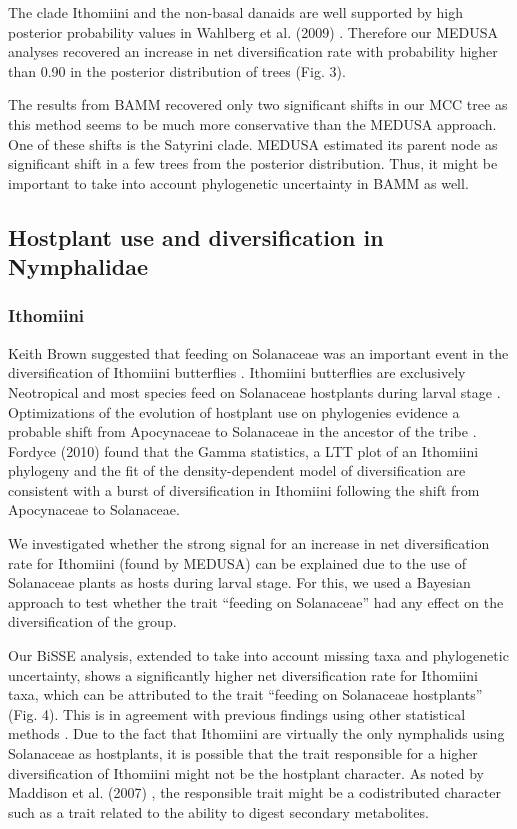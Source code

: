 \documentclass[10pt]{article}
\begin{document}
The clade Ithomiini and the non-basal danaids are well supported by high
posterior probability values in Wahlberg et al. (2009) \cite{wahlberg2009}.
Therefore our MEDUSA analyses recovered an increase in net
diversification rate with probability higher than 0.90 in the posterior
distribution of trees (Fig. 3).

The results from BAMM recovered only two significant shifts in our MCC tree
as this method seems to be much more conservative than the MEDUSA approach.
One of these 
shifts is the Satyrini clade. MEDUSA estimated its parent node as
significant shift in a few trees from the posterior distribution. 
Thus, it might be important to
take into account phylogenetic uncertainty in BAMM as well.

\subsection*{Hostplant use and diversification in
Nymphalidae}

\subsubsection*{Ithomiini}

Keith Brown suggested that feeding on Solanaceae was an important event
in the diversification of Ithomiini butterflies \cite{brown1987}. Ithomiini
butterflies are exclusively Neotropical and most species feed on
Solanaceae hostplants during larval stage \cite{willmott2006}.
Optimizations of the
evolution of hostplant use on phylogenies evidence a probable shift from
Apocynaceae to Solanaceae in the ancestor of the tribe 
\cite{willmott2006,brower2006}.
Fordyce (2010) \cite{fordyce2010} found that the Gamma statistics, a LTT plot of
an Ithomiini phylogeny and the fit of the density-dependent model of
diversification are consistent with a burst of diversification in
Ithomiini following the shift from Apocynaceae to Solanaceae.

We investigated whether the strong signal for an increase in net
diversification rate for Ithomiini (found by MEDUSA) can be explained
due to the use of Solanaceae plants as hosts during larval stage. For
this, we used a Bayesian approach \cite{fitzjohn2009} to test whether the trait
``feeding on Solanaceae'' had any effect on the diversification of the
group.

Our BiSSE analysis, extended to take into account missing taxa and
phylogenetic uncertainty, shows a significantly higher net
diversification rate for Ithomiini taxa, which can be attributed to the
trait ``feeding on Solanaceae hostplants'' (Fig. 4). This is in
agreement with previous findings using other statistical methods
\cite{fordyce2010}. Due to the fact that Ithomiini are virtually the only
nymphalids using Solanaceae as hostplants, it is possible that the trait
responsible for a higher diversification of Ithomiini might not be the
hostplant character. As noted by Maddison et al. (2007) \cite{maddison2007},
the responsible trait might be a codistributed character such as a trait
related to the ability to digest secondary metabolites.
\end{document}
